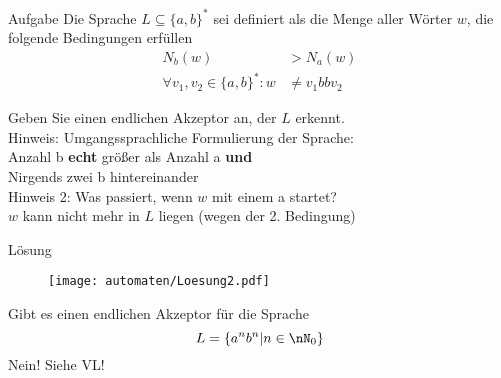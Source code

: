 \begin{frame}{Aufgabe}
	Die Sprache $L\subseteq \{a,b\}^* $ sei definiert als die Menge aller Wörter $w$, die folgende Bedingungen erfüllen 
	\begin{align*}
		N_b(w) &> N_a(w)  \\ \forall v_1,v_2 \in \{a,b\}^* : w &\neq v_1 bb v_2 
	\end{align*}

	Geben Sie einen endlichen Akzeptor an, der $L$ erkennt. \\
	
	\bigskip
	\pause
	Hinweis: Umgangssprachliche Formulierung der Sprache:\\ \pause
	Anzahl b \textbf{echt} größer als Anzahl a \textbf{und}\\
	Nirgends zwei b hintereinander\\
	
	\medskip
	\pause
	Hinweis 2: Was passiert, wenn $w$ mit einem a startet?\\ \pause
	$w$ kann nicht mehr in $L$ liegen (wegen der 2. Bedingung)
\end{frame}

\begin{frame}{Lösung}
	\begin{figure}
		\centering
		\texttt{[image: automaten/Loesung2.pdf]}
	\end{figure}
\end{frame}

\begin{frame}
	Gibt es einen endlichen Akzeptor für die Sprache $$L = \{ a^n b^n | n \in \nN_0 \}$$
	\pause
	Nein! Siehe VL!
\end{frame}
